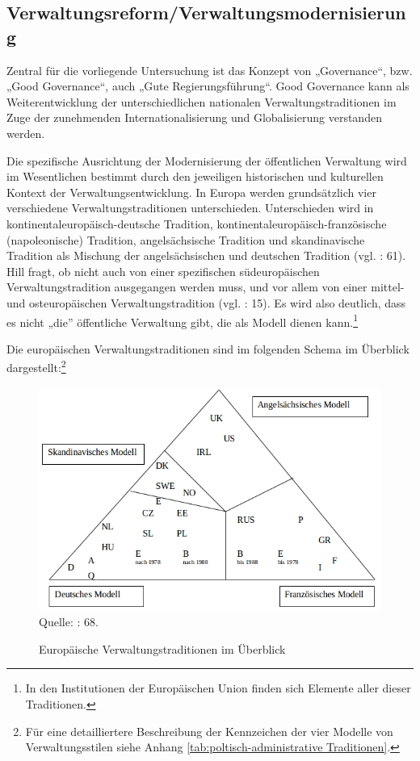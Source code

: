 \subsection{Verwaltungsreform/Verwaltungsmodernisierung }
Zentral für die vorliegende Untersuchung ist das Konzept von „Governance“, bzw. „Good Governance“, auch „Gute Regierungsführung“. Good Governance kann als Weiterentwicklung der unterschiedlichen nationalen Verwaltungstraditionen im Zuge der zunehmenden Internationalisierung und Globalisierung verstanden werden.
\par
Die spezifische Ausrichtung der Modernisierung der öffentlichen Verwaltung wird im Wesentlichen bestimmt durch den jeweiligen historischen und kulturellen Kontext der Verwaltungsentwicklung. In Europa werden grundsätzlich vier verschiedene Verwaltungstraditionen unterschieden. Unterschieden wird in kontinentaleuropäisch-deutsche Tradition, kontinentaleuropäisch-französische (napoleonische) Tradition, angelsächsische Tradition und skandinavische Tradition als Mischung der angelsächsischen und deutschen Tradition (vgl. \cite{lipumb05} : 61). Hill fragt, ob nicht auch von einer spezifischen südeuropäischen Verwaltungstradition ausgegangen werden muss, und vor allem von einer mittel- und osteuropäischen Verwaltungstradition (vgl. \cite{hill06} : 15). Es wird also deutlich, dass es nicht „die” öffentliche Verwaltung gibt, die als Modell dienen kann.\footnote{In den Institutionen der Europäischen Union finden sich Elemente aller dieser Traditionen.}
\par
Die europäischen Verwaltungstraditionen sind im folgenden Schema im Überblick dargestellt:\footnote{Für eine detailliertere Beschreibung der Kennzeichen der vier Modelle von Verwaltungsstilen siehe Anhang \ref{tab:poltisch-administrative Traditionen}.}
\begin{figure}[H]
  \caption{Europäische Verwaltungstraditionen im Überblick}
  \centering
  \includegraphics[width=5in]{Material/VerwaltungsModelle}\\
Quelle: \cite{lipumb05} : 68.
\end{figure}

